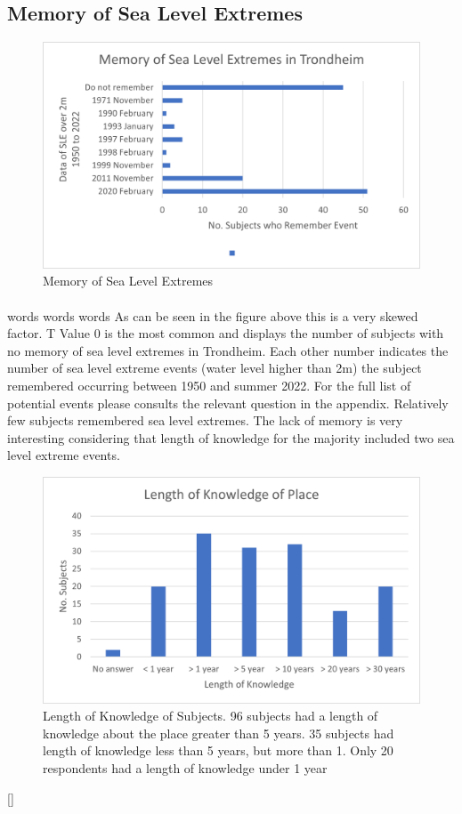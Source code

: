 \subsection{Memory of Sea Level Extremes}

\begin{figure}[h]
    \centering
    \includegraphics{fig_results/memory-sle.png}
    \caption{Memory of Sea Level Extremes}
    \label{fig:my_label}
\end{figure}
\paragraph{}
words words words
As can be seen in the figure above this is a very skewed factor. T Value 0 is the most common and displays the number of subjects with no memory of sea level extremes in Trondheim. Each other number indicates the number of sea level extreme events (water level higher than 2m) the subject remembered occurring between 1950 and summer 2022. For the full list of potential events please consults the relevant question in the appendix. Relatively few subjects remembered sea level extremes. The lack of memory is very interesting considering that length of knowledge for the majority included two sea level extreme events. 

\begin{figure}
    \centering
    \includegraphics{fig_results/long_know.png}
    \caption{Length of Knowledge of Subjects. 96 subjects had a length of knowledge about the place greater than 5 years. 35 subjects had length of knowledge less than 5 years, but more than 1. Only 20 respondents had a length of knowledge under 1 year}
    \label{fig:long_know}
\end{figure}[]


